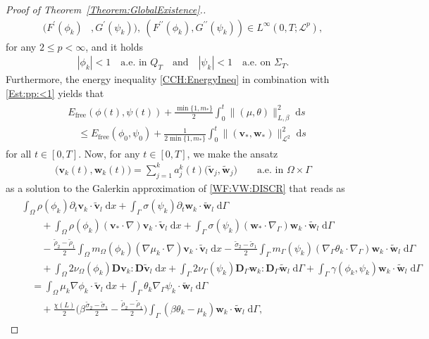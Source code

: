 \documentclass[10pt,reqno]{amsart}
\theoremstyle{remark}
\numberwithin{equation}{section}
\newcommand{\abs}[1]{| #1 |}
\newcommand{\norm}[1]{\| #1 \|}
\newcommand{\bv}{\mathbf{v}}
\newcommand{\bw}{\mathbf{w}}
\newcommand{\tv}{\widetilde{\bv}}
\newcommand{\tw}{\widetilde{\bw}}
\newcommand{\D}{\mathbf{D}}
\newcommand{\Dg}{\mathbf{D}_\Gamma}
\newcommand{\intO}{\int_\Omega}
\newcommand{\intG}{\int_\Gamma}
\newcommand{\dx}{\;\mathrm{d}x}
\newcommand{\ds}{\;\mathrm ds}
\newcommand{\dG}{\;\mathrm d\Ga}
\newcommand{\delt}{\partial_{t}}
\newcommand{\Grad}{\nabla}
\newcommand{\Gradg}{\nabla_\Ga}
\newcommand{\Om}{\Omega}
\newcommand{\Ga}{\Gamma}
\begin{document}
\begin{proof}[Proof of Theorem~\ref{Theorem:GlobalExistence}.]
\begin{subequations}
\begin{align}
        (F^\prime(\phi_k)&, G^\prime(\psi_k)), \ (F^{\prime\prime}(\phi_k), G^{\prime\prime}(\psi_k))\in L^\infty(0,T;\mathcal{L}^p),
    \end{align}
\end{subequations}
for any $2 \leq p <\infty$, and it holds
\begin{align}\label{Est:pp:<1}
    \abs{\phi_k} < 1 \quad\text{a.e.~in~}Q_T\quad\text{and} \quad\abs{\psi_k} < 1 \quad\text{a.e.~on~}\Sigma_T.
\end{align}
Furthermore, the energy inequality \eqref{CCH:EnergyIneq} in combination with \eqref{Est:pp:<1} yields that
\begin{align}\label{CCH:Fixed:EnergyEstimate}
    \begin{split}
        &E_{\mathrm{free}}(\phi(t),\psi(t)) + \frac{\min\{1,m_\ast\}}{2}\int_0^t\norm{(\mu,\theta)}_{L,\beta}^2\ds \\
        &\quad\leq E_{\mathrm{free}}(\phi_0,\psi_0) + \frac{1}{2\min\{1,m_\ast\}}\int_0^t\norm{(\bv_\ast,\bw_\ast)}_{\mathcal{L}^2}^2\ds
    \end{split}
\end{align}
for all $t\in[0,T]$.
Now, for any $t\in[0,T]$, we make the ansatz
\begin{align*}
    \big(\bv_k(t),\bw_k(t)\big) = \sum_{j=1}^k a_j^k(t)\big(\tv_j,\tw_j) \qquad\text{a.e.~in~}\Om\times\Ga
\end{align*}
as a solution to the Galerkin approximation of \eqref{WF:VW:DISCR} that reads as
\begin{align}
    \begin{split}
        &\intO\rho(\phi_k)\delt\bv_k\cdot\tv_l\dx + \intG\sigma(\psi_k)\delt\bw_k\cdot\tw_l\dG  \\
        &\qquad + \intO\rho(\phi_k)(\bv_\ast\cdot\Grad)\bv_k\cdot\tv_l\dx + \intG\sigma(\psi_k)(\bw_\ast\cdot\Gradg)\bw_k\cdot\tw_l\dG \\
        &\qquad - \frac{\tilde\rho_2 - \tilde\rho_1}{2}\intO m_\Om(\phi_k)(\Grad\mu_k\cdot\Grad)\bv_k\cdot\tv_l\dx - \frac{\tilde\sigma_2 - \tilde\sigma_1}{2}\intG m_\Ga(\psi_k)(\Gradg\theta_k\cdot\Gradg)\bw_k\cdot\tw_l\dG \label{GalerkinApprox} \\
        &\qquad  + \intO2\nu_\Om(\phi_k)\D\bv_k:\D\tv_l\dx + \intG2\nu_\Ga(\psi_k)\Dg\bw_k:\Dg\tw_l\dG  + \intG \gamma(\phi_k,\psi_k)\bw_k\cdot\tw_l\dG \\
        &\quad = \intO\mu_k\Grad\phi_k\cdot\tv_l\dx + \intG\theta_k\Gradg\psi_k\cdot\tw_l\dG \\
        &\qquad + \frac{\chi(L)}{2}\Big(\beta\frac{\tilde\sigma_2 -\tilde\sigma_1}{2} - \frac{\tilde\rho_2 - \tilde\rho_1}{2}\Big)\intG(\beta\theta_k - \mu_k)\bw_k\cdot\tw_l\dG,

\end{split}
\end{align}
\end{proof}
\end{document}
